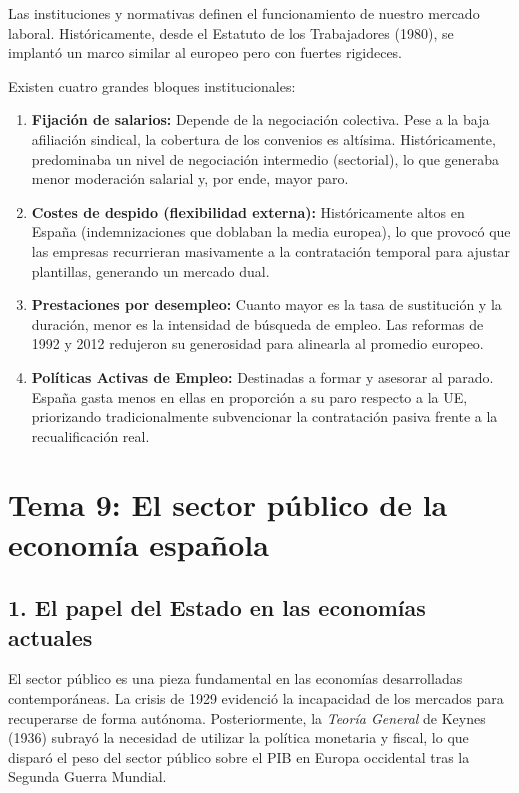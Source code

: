 Las instituciones y normativas definen el funcionamiento de nuestro mercado laboral. Históricamente, desde el Estatuto de los Trabajadores (1980), se implantó un marco similar al europeo pero con fuertes rigideces.

Existen cuatro grandes bloques institucionales:

\begin{enumerate}
  \item \textbf{Fijación de salarios:} Depende de la negociación colectiva. Pese a la baja afiliación sindical, la cobertura de los convenios es altísima. Históricamente, predominaba un nivel de negociación intermedio (sectorial), lo que generaba menor moderación salarial y, por ende, mayor paro.

  \item \textbf{Costes de despido (flexibilidad externa):} Históricamente altos en España (indemnizaciones que doblaban la media europea), lo que provocó que las empresas recurrieran masivamente a la contratación temporal para ajustar plantillas, generando un mercado dual.

  \item \textbf{Prestaciones por desempleo:} Cuanto mayor es la tasa de sustitución y la duración, menor es la intensidad de búsqueda de empleo. Las reformas de 1992 y 2012 redujeron su generosidad para alinearla al promedio europeo.

  \item \textbf{Políticas Activas de Empleo:} Destinadas a formar y asesorar al parado. España gasta menos en ellas en proporción a su paro respecto a la UE, priorizando tradicionalmente subvencionar la contratación pasiva frente a la recualificación real.
\end{enumerate}

\clearpage
\section*{Tema 9: El sector público de la economía española}

\subsection*{1. El papel del Estado en las economías actuales}

El sector público es una pieza fundamental en las economías desarrolladas contemporáneas. La crisis de 1929 evidenció la incapacidad de los mercados para recuperarse de forma autónoma. Posteriormente, la \textit{Teoría General} de Keynes (1936) subrayó la necesidad de utilizar la política monetaria y fiscal, lo que disparó el peso del sector público sobre el PIB en Europa occidental tras la Segunda Guerra Mundial.

